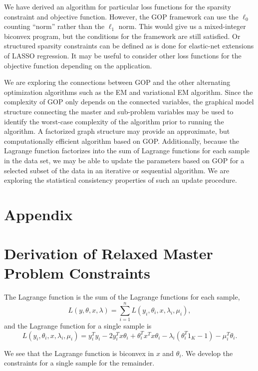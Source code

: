 \documentclass[11pt]{article}
\begin{document}
We have derived an algorithm for particular loss functions for the sparsity constraint and  objective function. 
However, the GOP framework can use the $\ell_0$ counting ``norm'' rather than the $\ell_1$ norm. 
This would give us a mixed-integer biconvex program, but the conditions for the framework are still satisfied. 
Or structured sparsity constraints can be defined as is done for elastic-net extensions of LASSO regression. 
It may be useful to consider other loss functions for the objective function depending on the application.

We are exploring the connections between GOP and the other alternating optimization algorithms such as the EM and variational EM algorithm. 
Since the complexity of GOP only depends on the connected variables, the graphical model structure connecting the master and sub-problem variables may be used to identify the worst-case complexity of the algorithm prior to running the algorithm. 
A factorized graph structure may provide an approximate, but computationally efficient algorithm based on GOP. 
Additionally, because the Lagrange function factorizes into the sum of Lagrange functions for each sample in the data set, we may be able to update the parameters based on GOP for a selected subset of the data in an iterative or sequential algorithm. 
We are exploring the statistical consistency properties of such an update procedure.


\section*{Appendix}
\appendix
\section{Derivation of Relaxed Master Problem Constraints}

The Lagrange function is the sum of the Lagrange functions for each sample,
\begin{equation}
L(y, \theta, x, \lambda) = \sum_{i=1}^n L(y_i, \theta_i, x, \lambda_i, \mu_i),
\end{equation}
and the Lagrange function for a single sample is
\begin{equation}
L(y_i, \theta_i, x, \lambda_i, \mu_i) = y_i^T y_i -2 y_i^T x\theta_i + \theta_i^T x^T x \theta_i - \lambda_i(\theta_i^T 1_K - 1) -\mu_i^T \theta_i.
\end{equation}

We see that the Lagrange function is biconvex in $x$ and $\theta_i$. We develop the constraints for a single sample for the remainder.
\end{document}
